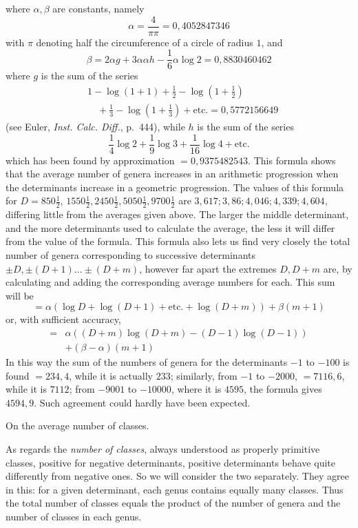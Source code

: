 where \(\alpha,\beta\) are constants, namely
\[\alpha=\frac{4}{\pi\pi}=0{,}4052847346\]
with \(\pi\) denoting half the circumference of a circle of radius \(1\), and
\[\beta=2\alpha g+3\alpha\alpha h-\frac16\alpha\log2=0{,}8830460462\]
where \(g\) is the sum of the series
\[\begin{aligned}&1-\log(1+1)+\frac12-\log(1+\frac12)\\&\quad+\frac13-\log(1+\frac13)+\text{etc.}=0{,}5772156649\end{aligned}\]
(see Euler, \textit{Inst. Calc. Diff.}, p.\ 444), while \(h\) is the sum of the series
\[\frac14\log2+\frac19\log3+\frac1{16}\log4+\text{etc.}\]
which has been found by approximation \(=0{,}9375482543\). This formula shows that the average number of genera increases in an arithmetic progression when the determinants increase in a geometric progression. The values of this formula for \(D=850\frac12\), \(1550\frac12,2450\frac12,5050\frac12,9700\frac12\) are \(3{,}617;3{,}86;4{,}046;4{,}339;4{,}604\), differing little from the averages given above. The larger the middle determinant, and the more determinants used to calculate the average, the less it will differ from the value of the formula. This formula also lets us find very closely the total number of genera corresponding to successive determinants \(\pm D,\pm(D+1)\ldots\pm(D+m)\), however far apart the extremes \(D,D+m\) are, by calculating and adding the corresponding average numbers for each. This sum will be
\[=\alpha(\log D+\log(D+1)+\text{etc.}+\log(D+m))+\beta(m+1)\]
or, with sufficient accuracy,
\[\begin{aligned}={}&\alpha((D+m)\log(D+m)-(D-1)\log(D-1))\\&+(\beta-\alpha)(m+1)\end{aligned}\]
In this way the sum of the numbers of genera for the determinants \(-1\) to \(-100\) is found \(=234{,}4\), while it is actually \(233\); similarly, from \(-1\) to \(-2000\), \(=7116{,}6\), while it is \(7112\); from \(-9001\) to \(-10000\), where it is \(4595\), the formula gives \(4594{,}9\). Such agreement could hardly have been expected.

\begin{center}On the average number of classes.\end{center}


As regards the \textit{number of classes}, always understood as properly primitive classes, positive for negative determinants, positive determinants behave quite differently from negative ones. So we will consider the two separately. They agree in this: for a given determinant, each genus contains equally many classes. Thus the total number of classes equals the product of the number of genera and the number of classes in each genus.

